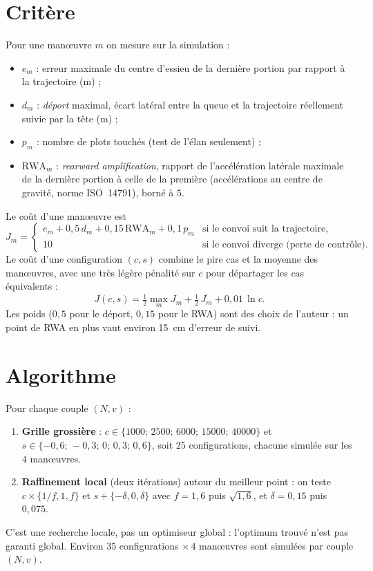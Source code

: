 \documentclass[a4paper,11pt]{article}
\begin{document}
\section{Critère}
Pour une manœuvre $m$ on mesure sur la simulation :
\begin{itemize}
  \item $e_m$ : erreur maximale du centre d'essieu de la dernière portion par rapport à la trajectoire (m) ;
  \item $d_m$ : \emph{déport} maximal, écart latéral entre la queue et la trajectoire réellement suivie par la tête (m) ;
  \item $p_m$ : nombre de plots touchés (test de l'élan seulement) ;
  \item $\mathrm{RWA}_m$ : \emph{rearward amplification}, rapport de l'accélération latérale maximale de la dernière portion à celle de la première (accélérations au centre de gravité, norme ISO~14791), borné à $5$.
\end{itemize}
Le coût d'une manœuvre est
\begin{equation}
  J_m=\begin{cases}
    e_m+0{,}5\,d_m+0{,}15\,\mathrm{RWA}_m+0{,}1\,p_m & \text{si le convoi suit la trajectoire,}\\
    10 & \text{si le convoi diverge (perte de contrôle).}
  \end{cases}
\end{equation}
Le coût d'une configuration $(c,s)$ combine le pire cas et la moyenne des manœuvres, avec une très légère pénalité sur $c$ pour départager les cas équivalents :
\begin{equation}
  J(c,s)=\tfrac12\max_m J_m+\tfrac12\,\overline{J_m}+0{,}01\,\ln c .
\end{equation}
Les poids ($0{,}5$ pour le déport, $0{,}15$ pour le RWA) sont des choix de l'auteur : un point de RWA en plus vaut environ \SI{15}{cm} d'erreur de suivi.

\section{Algorithme}
Pour chaque couple $(N,v)$ :
\begin{enumerate}
  \item \textbf{Grille grossière} : $c\in\{1000;\,2500;\,6000;\,15000;\,40000\}$ et $s\in\{-0{,}6;\,-0{,}3;\,0;\,0{,}3;\,0{,}6\}$, soit $25$ configurations, chacune simulée sur les $4$ manœuvres.
  \item \textbf{Raffinement local} (deux itérations) autour du meilleur point : on teste $c\times\{1/f,1,f\}$ et $s+\{-\delta,0,\delta\}$ avec $f=1{,}6$ puis $\sqrt{1{,}6}$, et $\delta=0{,}15$ puis $0{,}075$.
\end{enumerate}
C'est une recherche locale, pas un optimiseur global : l'optimum trouvé n'est pas garanti global. Environ $35$ configurations $\times\,4$ manœuvres sont simulées par couple $(N,v)$.
\end{document}
